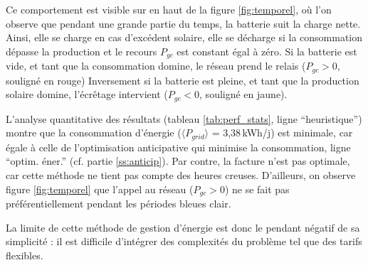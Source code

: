 \documentclass[a4paper,10pt,twocolumn]{article}
\providecommand{\avg}[1]{\langle#1\rangle}
\begin{document}
Ce comportement est visible sur en haut de la figure \ref{fig:temporel},
où l'on observe que pendant une grande partie du temps,
la batterie suit la charge nette. Ainsi, elle se charge en cas d'excédent solaire,
elle se décharge si la consommation dépasse la production
et le recours $P_{gc}$ est constant égal à zéro.
Si la batterie est vide, et tant que la consommation domine,
le réseau prend le relais ($P_{gc}>0$, souligné en rouge)
Inversement si la batterie est pleine, et tant que la production solaire domine,
l'écrêtage intervient ($P_{gc}<0$, souligné en jaune).

L'analyse quantitative des résultats (tableau \ref{tab:perf_stats}, ligne ``heuristique'')
montre que la consommation d'énergie ($\avg{P_{grid}}$ = 3,38\,kWh/j) est minimale, car égale à celle de 
l'optimisation anticipative qui minimise la consommation, ligne ``optim. éner.''
(cf. partie \ref{ss:anticip}).
Par contre, la facture n'est pas optimale, car cette méthode ne tient pas compte
des heures creuses. D'ailleurs, on observe figure \ref{fig:temporel}
que l'appel au réseau ($P_{gc}>0$) ne se fait pas préférentiellement pendant
les périodes bleues clair.

La limite de cette méthode de gestion d'énergie est donc le pendant négatif
de sa simplicité : il est difficile d'intégrer des complexités du problème
tel que des tarifs flexibles.

%
%
\end{document}
